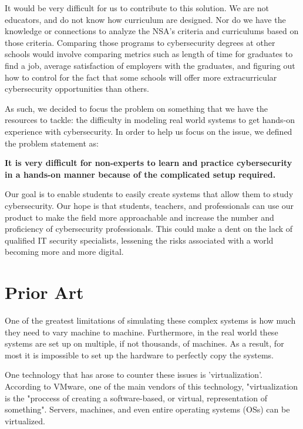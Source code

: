 \documentclass[openright]{report}
\begin{document}
\par It would be very difficult for us to contribute to this solution. We are not educators, and do not know how curriculum are designed. Nor do we have the knowledge or connections to analyze the NSA's criteria and curriculums based on those criteria. Comparing those programs to cybersecurity degrees at other schools would involve comparing metrics such as length of time for graduates to find a job, average satisfaction of employers with the graduates, and figuring out how to control for the fact that some schools will offer more extracurricular cybersecurity opportunities than others. 

\par As such, we decided to focus the problem on something that we have the resources to tackle: the difficulty in modeling real world systems to get hands-on experience with cybersecurity. In order to help us focus on the issue, we defined the problem statement as:

\textbf{It is very difficult for non-experts to learn and practice cybersecurity in a hands-on manner because of the complicated setup required.}

\par Our goal is to enable students to easily create systems that allow them to study cybersecurity. Our hope is that students, teachers, and professionals can use our product to make the field more approachable and increase the number and proficiency of cybersecurity professionals. This could make a dent on the lack of qualified IT security specialists, lessening the risks associated with a world becoming more and more digital.

\section{Prior Art}

\par One of the greatest limitations of simulating these complex systems is how much they need to vary machine to machine. Furthermore, in the real world these systems are set up on multiple, if not thousands, of machines. As a result, for most it is impossible to set up the hardware to perfectly copy the systems.

\par One technology that has arose to counter these issues is 'virtualization'. According to VMware, one of the main vendors of this technology, "virtualization is the "proccess of creating a software-based, or virtual, representation of something"\cite{virtualization_def}. Servers, machines, and even entire operating systems (OSs) can be virtualized. 
\end{document}
